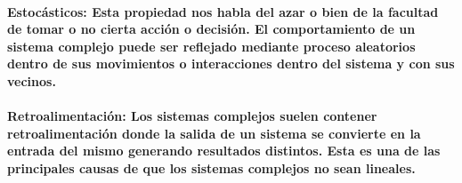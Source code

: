       \paragraph{\textbf{Estocásticos}: Esta propiedad nos habla del azar o bien de la facultad de tomar o no cierta acción o decisión. El comportamiento de un sistema complejo puede ser reflejado mediante proceso aleatorios dentro de sus movimientos o interacciones dentro del sistema y con sus vecinos.}
      \paragraph{\textbf{Retroalimentación}: Los sistemas complejos suelen contener retroalimentación donde la salida de un sistema se convierte en la entrada del mismo generando resultados distintos. Esta es una de las principales causas de que los sistemas complejos no sean lineales.\cite{3} \cite{5}}